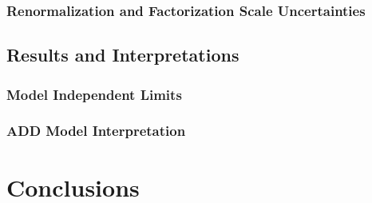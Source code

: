 \documentclass[10pt,twoside,cucitura,classica,english,openany]{toptesi}
\begin{document}


\subsection{Renormalization and Factorization Scale Uncertainties}
\label{sec:renorm-fact-scale}



\section{Results and Interpretations}
\label{sec:results-interpr}



\subsection{Model Independent Limits}
\label{sec:model-indep-limits-1}



\subsection{ADD Model Interpretation}
\label{sec:add-model-interpr}



\chapter{Conclusions}
\label{cha:conclusions}



 \printbibliography
\end{document}
